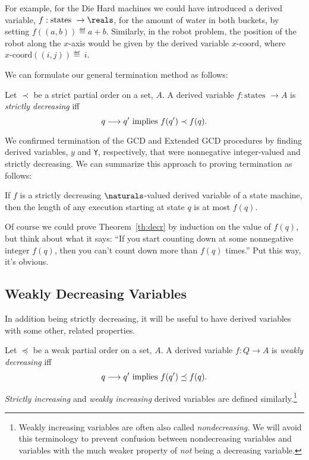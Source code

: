 For example, for the Die Hard machines we could have introduced a derived
variable, $f: \text{states } \to \reals$, for the amount of water in both
buckets, by setting $f((a, b)) \eqdef a + b$.  Similarly, in the robot
problem, the position of the robot along the $x$-axis would be given by
the derived variable $x\text{-coord}$, where $x\text{-coord}((i, j))
\eqdef~i$.

We can formulate our general termination method as follows:

\begin{definition}
  Let $\prec$ be a strict partial order on a set, $A$.  A derived variable
  $f : \text{states } \to A$ is \emph{strictly decreasing} iff
\[
q \mathrel{\longrightarrow} q' \text{  implies  } f(q') \prec f(q).
\]
\end{definition}

We confirmed termination of the GCD and Extended GCD procedures by finding
derived variables, $y$ and \texttt{Y}, respectively, that were nonnegative
integer-valued and strictly decreasing.  We can summarize this approach to
proving termination as follows:
\begin{theorem}
\label{th:decr}
If $f$ is a strictly decreasing $\naturals$-valued derived variable of a
state machine, then the length of any execution starting at state $q$ is
at most $f(q)$.
\end{theorem}

Of course we could prove Theorem~\ref{th:decr} by induction on the value
of $f(q)$, but think about what it says: ``If you start counting down at
some nonnegative integer $f(q)$, then you can't count down more than
$f(q)$ times.''  Put this way, it's obvious.

\subsection{Weakly Decreasing Variables}

In addition being strictly decreasing, it will be useful to have derived
variables with some other, related properties.

\begin{definition}
Let $\preceq$ be a weak partial order on a set, $A$.  A derived variable
$f : Q \to A$ is \emph{weakly decreasing} iff
\[
q \mathrel{\longrightarrow} q' \text{  implies  } f(q') \preceq f(q).
\]

\emph{Strictly increasing} and \emph{weakly increasing} derived variables
are defined similarly.\footnote{Weakly increasing variables are often also
called \emph{nondecreasing}.  We will avoid this terminology to prevent
confusion between nondecreasing variables and variables with the much
weaker property of \emph{not} being a decreasing variable.}
\end{definition}

